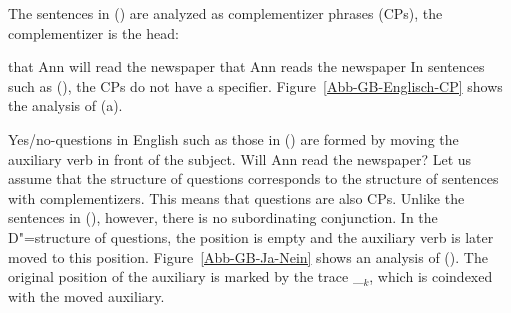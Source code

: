 \largerpage
The sentences in () are analyzed as complementizer phrases (CPs), the complementizer is the head:

\eal
\ex that Ann will read the newspaper
\ex\label{ex-that-ann-reads-the-newspaper}that Ann reads the newspaper
\zl
In sentences such as (), the CPs do not have a specifier. Figure~\vref{Abb-GB-Englisch-CP} shows the analysis
of (a). 
\begin{figure}
\begin{floatrow}
\end{floatrow}
\end{figure}%

Yes/no-questions\label{Seite-GB-Entscheidungsfragen-Englisch} in English such as those in () are formed by moving the auxiliary verb in front of the subject.
\ea
Will Ann read the newspaper?
\z
Let us assume that the structure of questions corresponds to the structure of sentences with complementizers. This means that questions are also
CPs. Unlike the sentences in (), however, there is no subordinating conjunction. In the D"=structure of questions, the \cnull position is
empty and the auxiliary verb is later moved to this position. Figure~\ref{Abb-GB-Ja-Nein} shows an analysis of ().
The original position of the auxiliary is marked by the trace \_$_k$, which is coindexed with the moved auxiliary.

